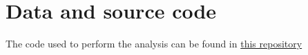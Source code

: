\chapter{Data and source code}\label{data_and_source_code}
The code used to perform the analysis can be found in \href{https://github.com/cristiban/thesis}{this repository}